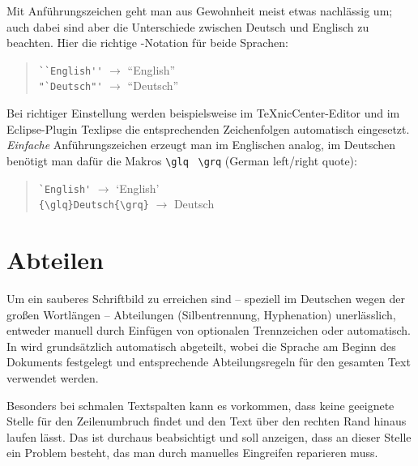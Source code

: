 Mit Anführungszeichen geht man aus Gewohnheit meist etwas
nachlässig um; auch dabei sind aber die Unterschiede zwischen Deutsch
und Englisch zu beachten. Hier die richtige \latex-Notation für
beide Sprachen:
%
\begin{quote}
\verb!``English''! $\rightarrow$ ``English'' \\
\verb!"`Deutsch"'! $\rightarrow$ "`Deutsch"' 
\end{quote}
%
Bei richtiger Einstellung werden beispielsweise im TeXnicCenter-Editor und im
Eclipse-Plugin Texlipse die entsprechenden Zeichenfolgen automatisch
eingesetzt. \emph{Einfache} Anführungszeichen erzeugt man im Englischen analog, im Deutschen benötigt man dafür die Makros \verb!\glq! \bzw\ \verb!\grq! (German left/right quote):
\begin{quote}
\verb!`English'! $\rightarrow$ `English' \\
\verb!{\glq}Deutsch{\grq}! $\rightarrow$ {\glq}Deutsch{\grq} 
\end{quote}





\section{Abteilen}
\label{subsec:layout-abteilen}

Um ein sauberes Schriftbild zu erreichen sind -- speziell im
Deutschen wegen der großen Wortlängen -- Abteilungen
(Silbentrennung, Hyphenation) unerlässlich, entweder manuell durch
Einfügen von optionalen Trennzeichen oder automatisch. In \latex
wird grundsätzlich automatisch abgeteilt, wobei die Sprache am
Beginn des Dokuments festgelegt und entsprechende Abteilungsregeln
für den gesamten Text verwendet werden.

Besonders bei schmalen Textspalten kann es vorkommen, dass \latex
keine geeignete Stelle für den Zeilenumbruch findet und den Text
über den rechten Rand hinaus laufen lässt. Das ist durchaus
beabsichtigt und soll anzeigen, dass an dieser Stelle ein Problem
besteht, das man durch manuelles Eingreifen reparieren muss.

